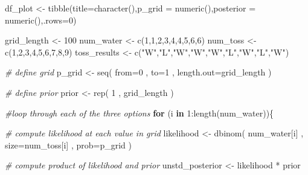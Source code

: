 \documentclass[
]{book}
\newenvironment{Shaded}{\begin{snugshade}}{\end{snugshade}}
\newcommand{\AttributeTok}[1]{\textcolor[rgb]{0.77,0.63,0.00}{#1}}
\newcommand{\CommentTok}[1]{\textcolor[rgb]{0.56,0.35,0.01}{\textit{#1}}}
\newcommand{\ControlFlowTok}[1]{\textcolor[rgb]{0.13,0.29,0.53}{\textbf{#1}}}
\newcommand{\DecValTok}[1]{\textcolor[rgb]{0.00,0.00,0.81}{#1}}
\newcommand{\FunctionTok}[1]{\textcolor[rgb]{0.00,0.00,0.00}{#1}}
\newcommand{\NormalTok}[1]{#1}
\newcommand{\OtherTok}[1]{\textcolor[rgb]{0.56,0.35,0.01}{#1}}
\newcommand{\SpecialCharTok}[1]{\textcolor[rgb]{0.00,0.00,0.00}{#1}}
\newcommand{\StringTok}[1]{\textcolor[rgb]{0.31,0.60,0.02}{#1}}
\begin{document}
\begin{Shaded}
\begin{Highlighting}[]
\NormalTok{df\_plot }\OtherTok{\textless{}{-}} \FunctionTok{tibble}\NormalTok{(}\AttributeTok{title=}\FunctionTok{character}\NormalTok{(),}\AttributeTok{p\_grid =} \FunctionTok{numeric}\NormalTok{(),}\AttributeTok{posterior =} \FunctionTok{numeric}\NormalTok{(),}\AttributeTok{.rows=}\DecValTok{0}\NormalTok{)}

\NormalTok{grid\_length }\OtherTok{\textless{}{-}} \DecValTok{100}
\NormalTok{num\_water }\OtherTok{\textless{}{-}} \FunctionTok{c}\NormalTok{(}\DecValTok{1}\NormalTok{,}\DecValTok{1}\NormalTok{,}\DecValTok{2}\NormalTok{,}\DecValTok{3}\NormalTok{,}\DecValTok{4}\NormalTok{,}\DecValTok{4}\NormalTok{,}\DecValTok{5}\NormalTok{,}\DecValTok{6}\NormalTok{,}\DecValTok{6}\NormalTok{)   }
\NormalTok{num\_toss }\OtherTok{\textless{}{-}} \FunctionTok{c}\NormalTok{(}\DecValTok{1}\NormalTok{,}\DecValTok{2}\NormalTok{,}\DecValTok{3}\NormalTok{,}\DecValTok{4}\NormalTok{,}\DecValTok{5}\NormalTok{,}\DecValTok{6}\NormalTok{,}\DecValTok{7}\NormalTok{,}\DecValTok{8}\NormalTok{,}\DecValTok{9}\NormalTok{)}
\NormalTok{toss\_results }\OtherTok{\textless{}{-}} \FunctionTok{c}\NormalTok{(}\StringTok{"W"}\NormalTok{,}\StringTok{"L"}\NormalTok{,}\StringTok{"W"}\NormalTok{,}\StringTok{"W"}\NormalTok{,}\StringTok{"W"}\NormalTok{,}\StringTok{"L"}\NormalTok{,}\StringTok{"W"}\NormalTok{,}\StringTok{"L"}\NormalTok{,}\StringTok{"W"}\NormalTok{) }

\CommentTok{\# define grid }
\NormalTok{p\_grid }\OtherTok{\textless{}{-}} \FunctionTok{seq}\NormalTok{( }\AttributeTok{from=}\DecValTok{0}\NormalTok{ , }\AttributeTok{to=}\DecValTok{1}\NormalTok{ , }\AttributeTok{length.out=}\NormalTok{grid\_length )}

\CommentTok{\# define prior }
\NormalTok{prior }\OtherTok{\textless{}{-}} \FunctionTok{rep}\NormalTok{( }\DecValTok{1}\NormalTok{ , grid\_length )}

\CommentTok{\#loop through each of the three options}
\ControlFlowTok{for}\NormalTok{ (i }\ControlFlowTok{in} \DecValTok{1}\SpecialCharTok{:}\FunctionTok{length}\NormalTok{(num\_water))\{}

  \CommentTok{\# compute likelihood at each value in grid }
\NormalTok{  likelihood }\OtherTok{\textless{}{-}} \FunctionTok{dbinom}\NormalTok{( num\_water[i] , }\AttributeTok{size=}\NormalTok{num\_toss[i] , }\AttributeTok{prob=}\NormalTok{p\_grid )}
  
  \CommentTok{\# compute product of likelihood and prior }
\NormalTok{  unstd\_posterior }\OtherTok{\textless{}{-}}\NormalTok{ likelihood }\SpecialCharTok{*}\NormalTok{ prior}
  

\end{Highlighting}
\end{Shaded}
\end{document}
